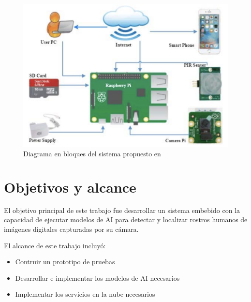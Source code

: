 \begin{figure}[h]
	\centering
	\includegraphics[scale=0.4]{./Figures/soa_arch.png}
	\caption{Diagrama en bloques del sistema propuesto en \cite{soa_ref}}
	\label{fig:soa_arch}
\end{figure}

\section{Objetivos y alcance}
El objetivo principal de este trabajo fue desarrollar un sistema embebido con la capacidad de ejecutar modelos de AI para detectar y localizar rostros humanos de imágenes digitales capturadas por su cámara.

El alcance de este trabajo incluyó:
\begin{itemize}
	\item Contruir un prototipo de pruebas
	\item Desarrollar e implementar los modelos de AI necesarios
	\item Implementar los servicios en la nube necesarios
\end{itemize}
